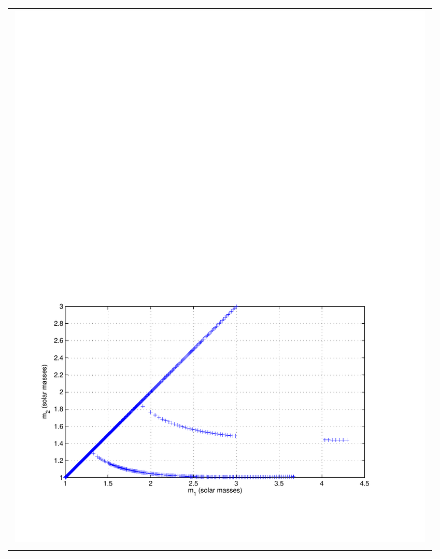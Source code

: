 \begin{figure}[p]
\begin{tabular}{c}
\includegraphics[width=\linewidth]{figures/pipeline/bns_bank}\\

\end{tabular}
\end{figure}
